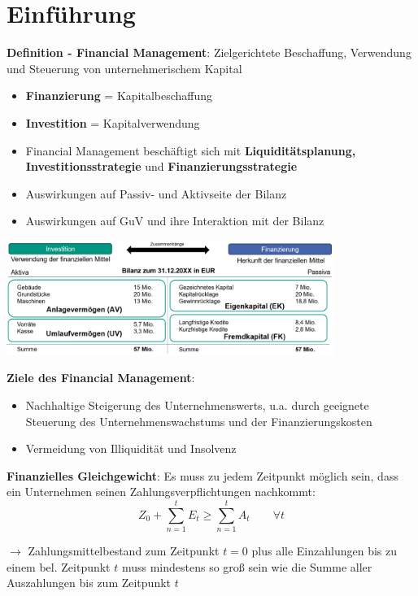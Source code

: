 \section{Einführung}

\textbf{Definition - Financial Management}: Zielgerichtete Beschaffung, Verwendung und Steuerung von unternehmerischem Kapital
\begin{itemize}
	\item \textbf{Finanzierung} = Kapitalbeschaffung
	\item \textbf{Investition} = Kapitalverwendung
	\item Financial Management beschäftigt sich mit \textbf{Liquiditätsplanung, Investitionsstrategie} und \textbf{Finanzierungsstrategie}
	\item Auswirkungen auf Passiv- und Aktivseite der Bilanz
	\item Auswirkungen auf GuV und ihre Interaktion mit der Bilanz
\end{itemize}
\begin{center}
	\includegraphics[width=0.8\textwidth]{images/bilanz.png}
\end{center}

\textbf{Ziele des Financial Management}:
\begin{itemize}
	\item Nachhaltige Steigerung des Unternehmenswerts, u.a. durch geeignete Steuerung des Unternehmenswachstums und der Finanzierungskosten
	\item Vermeidung von Illiquidität und Insolvenz
\end{itemize}
\bigskip
\textbf{Finanzielles Gleichgewicht}: Es muss zu jedem Zeitpunkt möglich sein, dass ein Unternehmen seinen Zahlungsverpflichtungen nachkommt: 
$$Z_0+\sum\limits_{n=1}^t E_t\geq\sum\limits_{n=1}^t A_t\qquad\forall t$$

$\rightarrow$ Zahlungsmittelbestand zum Zeitpunkt $t=0$ plus alle Einzahlungen bis zu einem bel. Zeitpunkt $t$ muss mindestens so groß sein wie die Summe aller Auszahlungen bis zum Zeitpunkt $t$

